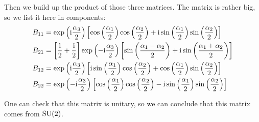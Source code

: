 \documentclass[11pt, english, fleqn, DIV=15, headinclude, BCOR=1cm]{scrartcl}
\begin{document}
Then we build up the product of those three matrices. The matrix is rather
big, so we list it here in components:
\begin{align*}
    B_{11} &= \exp\left( \mathrm i \frac{\alpha_3}2 \right) \left[ \cos\left( \frac{\alpha_1}2 \right) \cos\left( \frac{\alpha_2}2 \right) + \mathrm i \sin\left( \frac{\alpha_1}2 \right) \sin\left( \frac{\alpha_2}2 \right) \right] \\
    B_{21} &= \left[ \frac 12 + \frac{\mathrm i}2 \right] \exp\left( - \mathrm i \frac{\alpha_3}2 \right)
    \left[ \sin\left( \frac{\alpha_1-\alpha_2}2 \right) + \mathrm i \sin\left( \frac{\alpha_1 +
    \alpha_2}2 \right)  \right] \\
    B_{12} &= \exp\left( \mathrm i \frac{\alpha_3}2 \right) \left[ \mathrm i
\sin\left( \frac{\alpha_1}2 \right) \cos\left( \frac{\alpha_2}2 \right) +
\cos\left( \frac{\alpha_1}2 \right) \sin\left( \frac{\alpha_2}2 \right) \right] \\
    B_{22} &= \exp\left( - \mathrm i \frac{\alpha_3}2 \right) \left[ \cos\left( \frac{\alpha_1}2 \right)
\cos\left( \frac{\alpha_2}2 \right) - \mathrm i \sin\left( \frac{\alpha_1}2 \right)
\sin\left( \frac{\alpha_2}2 \right) \right]
\end{align*}

One can check that this matrix is unitary, so we can conclude that this matrix
comes from $\mathrm{SU}(2)$.
\end{document}
